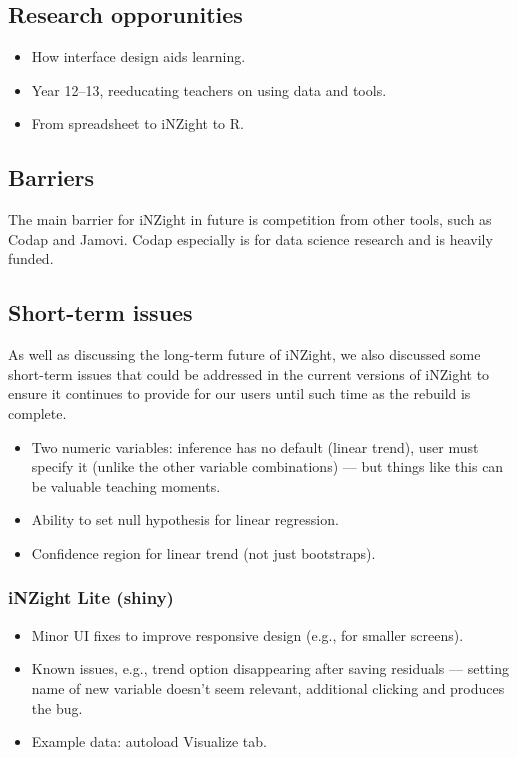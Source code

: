 \documentclass{article}
\begin{document}
\subsection{Research opporunities}

\begin{itemize}
    \item How interface design aids learning.
    \item Year 12--13, reeducating teachers on using data and tools.
    \item From spreadsheet to iNZight to R.
\end{itemize}

\subsection{Barriers}

The main barrier for iNZight in future is competition from other tools, such as Codap and Jamovi.
Codap especially is for data science research and is heavily funded.


\subsection{Short-term issues}

As well as discussing the long-term future of iNZight, we also discussed some short-term issues that could be addressed in the current versions of iNZight to ensure it continues to provide for our users until such time as the rebuild is complete.

\begin{itemize}
    \item Two numeric variables: inference has no default (linear trend), user must specify it (unlike the other variable combinations) --- but things like this can be valuable teaching moments.
    \item Ability to set null hypothesis for linear regression.
    \item Confidence region for linear trend (not just bootstraps).
\end{itemize}

\subsubsection{iNZight Lite (shiny)}

\begin{itemize}
    \item Minor UI fixes to improve responsive design (e.g., for smaller screens).
    \item Known issues, e.g., trend option disappearing after saving residuals --- setting name of new variable doesn't seem relevant, additional clicking and produces the bug.
    \item Example data: autoload Visualize tab.
\end{itemize}
\end{document}
